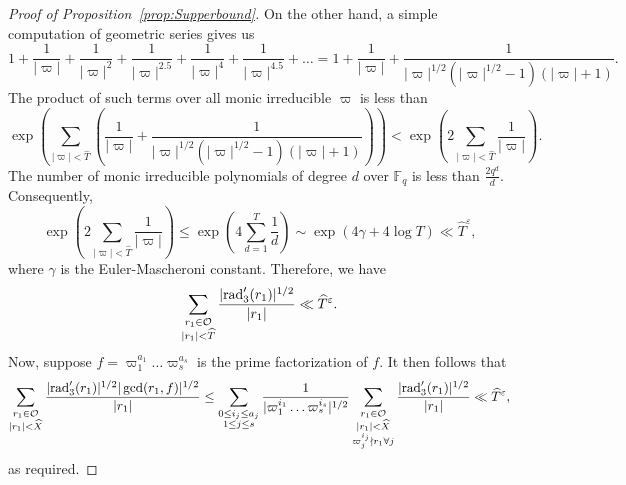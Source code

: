 \documentclass[11pt]{amsart}
\theoremstyle{plain}
\theoremstyle{plain}
\theoremstyle{remark}
\theoremstyle{definition}
\newcommand{\rad}{\textup{rad}'_3}
\renewcommand{\hat}{\widehat}
\begin{document}
\begin{proof}[Proof of Proposition~\ref{prop:Supperbound}]
On the other hand, a simple computation of geometric series gives us 
\[1+\frac{1}{|\varpi|}+\frac{1}{|\varpi|^2}+\frac{1}{|\varpi|^{2.5}}+\frac{1}{|\varpi|^4}+\frac{1}{|\varpi|^{4.5}}+\hdots=1+\frac{1}{|\varpi|}+\frac{1}{|\varpi|^{1/2}(|\varpi|^{1/2}-1)(|\varpi|+1)}.\]
The product of such terms over all monic irreducible $\varpi$ is less than
\[\exp\left(\sum_{|\varpi|<\hat{T}}\left(\frac{1}{|\varpi|}+\frac{1}{|\varpi|^{1/2}(|\varpi|^{1/2}-1)(|\varpi|+1)}\right)\right)<\exp\left(2\sum_{|\varpi|<\hat{T}}\frac{1}{|\varpi|}\right).\]
The number of monic irreducible polynomials of degree $d$ over $\mathbb{F}_q$ is less than $\frac{2{q}^{d}}{d}$. Consequently,
\[\exp\left(2\sum_{|\varpi|<\hat{T}}\frac{1}{|\varpi|}\right)\leq\exp\left(4\sum_{d=1}^{T}\frac{1}{d}\right)\sim \exp(4\gamma+4\log T)\ll \hat{T}^{\varepsilon},\]
where $\gamma$ is the Euler-Mascheroni constant. Therefore, we have
\[\sum_{\substack{r_1\in\mathcal{O}\\|r_1|<\hat{T}}}\frac{|\rad(r_1)|^{1/2}}{|r_1|}\ll \hat{T}^{\varepsilon}.\]
Now, suppose $f=\varpi_1^{a_1}\hdots\varpi_s^{a_s}$ is the prime factorization of $f$. It then follows that
\[\sum_{\substack{r_1\in\mathcal{O}\\|r_1|<\hat{X}}}\frac{|\rad(r_1)|^{1/2}|\gcd(r_1,f)|^{1/2}}{|r_1|}\leq \sum_{\substack{0\leq i_j\leq a_{j}\\ 1\leq j\leq s}}\frac{1}{|\varpi_1^{i_1}\hdots\varpi_s^{i_s}|^{1/2}}\sum_{\substack{r_1\in\mathcal{O}\\|r_1|<\hat{X}\\ \varpi_j^{i_j}\nmid r_1\forall j}}\frac{|\rad(r_1)|^{1/2}}{|r_1|}\ll \hat{T}^{\varepsilon},\]
as required.
\end{proof}
\end{document}
